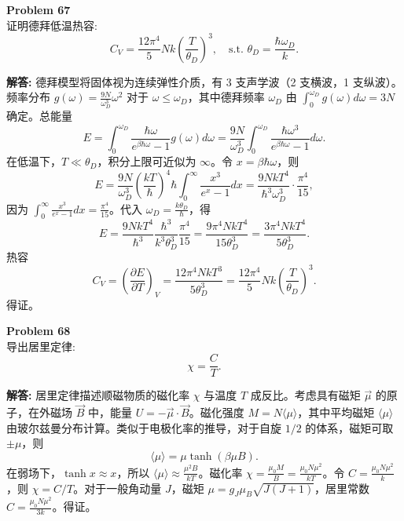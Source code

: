 \documentclass[12pt, a4paper, oneside]{ctexart}
\newenvironment{solution}{\par\noindent\textbf{解答:}\quad}{\par}
\begin{document}
\begin{mdframed}[backgroundcolor=gray!10, linewidth=0pt]
    \textbf{Problem 67} \\
    证明德拜低温热容:
    \[
    C_V = \frac{12\pi^4}{5} N k \left( \frac{T}{\theta_D} \right)^3, \quad \text{s.t. } \theta_D = \frac{\hbar \omega_D}{k}.
    \]
\end{mdframed}
\begin{solution}
    德拜模型将固体视为连续弹性介质，有 3 支声学波（2 支横波，1 支纵波）。频率分布 $g(\omega) = \frac{9N}{\omega_D^3} \omega^2$ 对于 $\omega \le \omega_D$，其中德拜频率 $\omega_D$ 由 $\int_0^{\omega_D} g(\omega) d\omega = 3N$ 确定。总能量
    \[
    E = \int_0^{\omega_D} \frac{\hbar \omega}{e^{\beta \hbar \omega} - 1} g(\omega) d\omega = \frac{9N}{\omega_D^3} \int_0^{\omega_D} \frac{\hbar \omega^3}{e^{\beta \hbar \omega} - 1} d\omega.
    \]
    在低温下，$T \ll \theta_D$，积分上限可近似为 $\infty$。令 $x = \beta \hbar \omega$，则
    \[
    E = \frac{9N}{\omega_D^3} \left( \frac{kT}{\hbar} \right)^4 \hbar \int_0^{\infty} \frac{x^3}{e^x - 1} dx = \frac{9N k T^4}{\hbar^3 \omega_D^3} \cdot \frac{\pi^4}{15},
    \]
    因为 $\int_0^\infty \frac{x^3}{e^x - 1} dx = \frac{\pi^4}{15}$。代入 $\omega_D = \frac{k \theta_D}{\hbar}$，得
    \[
    E = \frac{9N k T^4}{\hbar^3} \frac{\hbar^3}{k^3 \theta_D^3} \frac{\pi^4}{15} = \frac{9\pi^4 N k T^4}{15 \theta_D^3} = \frac{3\pi^4 N k T^4}{5 \theta_D^3}.
    \]
    热容
    \[
    C_V = \left( \frac{\partial E}{\partial T} \right)_V = \frac{12\pi^4 N k T^3}{5 \theta_D^3} = \frac{12\pi^4}{5} N k \left( \frac{T}{\theta_D} \right)^3.
    \]
    得证。
\end{solution}

\begin{mdframed}[backgroundcolor=gray!10, linewidth=0pt]
    \textbf{Problem 68} \\
    导出居里定律:
    \[
    \chi = \frac{C}{T}.
    \]
\end{mdframed}
\begin{solution}
    居里定律描述顺磁物质的磁化率 $\chi$ 与温度 $T$ 成反比。考虑具有磁矩 $\vec{\mu}$ 的原子，在外磁场 $\vec{B}$ 中，能量 $U = -\vec{\mu} \cdot \vec{B}$。磁化强度 $M = N \langle \mu \rangle$，其中平均磁矩 $\langle \mu \rangle$ 由玻尔兹曼分布计算。类似于电极化率的推导，对于自旋 $1/2$ 的体系，磁矩可取 $\pm \mu$，则
    \[
    \langle \mu \rangle = \mu \tanh(\beta \mu B).
    \]
    在弱场下，$\tanh x \approx x$，所以 $\langle \mu \rangle \approx \frac{\mu^2 B}{kT}$。磁化率 $\chi = \frac{\mu_0 M}{B} = \frac{\mu_0 N \mu^2}{k T}$。令 $C = \frac{\mu_0 N \mu^2}{k}$，则 $\chi = C / T$。对于一般角动量 $J$，磁矩 $\mu = g_J \mu_B \sqrt{J(J+1)}$，居里常数 $C = \frac{\mu_0 N \mu^2}{3k}$。得证。
\end{solution}
\end{document}
